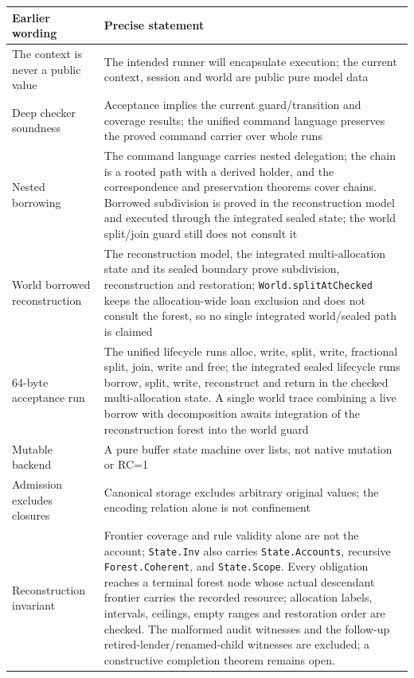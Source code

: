 \documentclass[10pt,a4paper]{article}
\begin{document}
\begin{center}
\begin{tabular}{@{}lp{}@{}}
\toprule
Earlier wording & Precise statement \\
\midrule
The context is never a public value & The intended runner will encapsulate execution; the current context, session and world are public pure model data \\
Deep checker soundness & Acceptance implies the current guard/transition and coverage results; the unified command language preserves the proved command carrier over whole runs \\
Nested borrowing & The command language carries nested delegation; the chain is a rooted path with a derived holder, and the correspondence and preservation theorems cover chains. Borrowed subdivision is proved in the reconstruction model and executed through the integrated sealed state; the world split/join guard still does not consult it \\
World borrowed reconstruction & The reconstruction model, the integrated multi-allocation state and its sealed boundary prove subdivision, reconstruction and restoration; \texttt{World.splitAtChecked} keeps the allocation-wide loan exclusion and does not consult the forest, so no single integrated world/sealed path is claimed \\
64-byte acceptance run & The unified lifecycle runs alloc, write, split, write, fractional split, join, write and free; the integrated sealed lifecycle runs borrow, split, write, reconstruct and return in the checked multi-allocation state. A single world trace combining a live borrow with decomposition awaits integration of the reconstruction forest into the world guard \\
Mutable backend & A pure buffer state machine over lists, not native mutation or RC=1 \\
Admission excludes closures & Canonical storage excludes arbitrary original values; the encoding relation alone is not confinement \\
Reconstruction invariant & Frontier coverage and rule validity alone are not the account; \texttt{State.Inv} also carries \texttt{State.Accounts}, recursive \texttt{Forest.Coherent}, and \texttt{State.Scope}. Every obligation reaches a terminal forest node whose actual descendant frontier carries the recorded resource; allocation labels, intervals, ceilings, empty ranges and restoration order are checked. The malformed audit witnesses and the follow-up retired-lender/renamed-child witnesses are excluded; a constructive completion theorem remains open. \\

\end{tabular}
\end{center}
\end{document}
